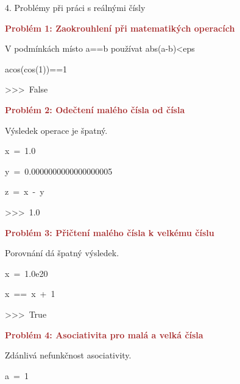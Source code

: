 \documentclass[czech]{beamer}
\newenvironment{lyxcode}
  {\par\begin{list}{}{
    \setlength{\rightmargin}{\leftmargin}
    \setlength{\listparindent}{0pt}%
    \raggedright
    \setlength{\itemsep}{0pt}
    \setlength{\parsep}{0pt}
    \normalfont\ttfamily}%
   \def\{{\char`\{}
   \def\}{\char`\}}
   \def\textasciitilde{\char`\~}
   \item[]}
  {\end{list}}
\begin{document}
\begin{frame}[plain]{4. Problémy při práci s reálnými čísly}

{\tiny\textbf{\textcolor{brown}{Problém 1: Zaokrouhlení při matematikých
operacích}}}{\tiny\par}

{\tiny V podmínkách místo a==b používat abs(a-b)<eps}{\tiny\par}
\begin{lyxcode}
{\tiny acos(cos(1))==1}{\tiny\par}

{\tiny >\textcompwordmark >\textcompwordmark >~False}{\tiny\par}
\end{lyxcode}
{\tiny\textbf{\textcolor{brown}{Problém 2: Odečtení malého čísla od
čísla}}}{\tiny\par}

{\tiny Výsledek operace je špatný.}{\tiny\par}
\begin{lyxcode}
{\tiny x~=~1.0}{\tiny\par}

{\tiny y~=~0.0000000000000000005}{\tiny\par}

{\tiny z~=~x~-~y}{\tiny\par}

{\tiny >\textcompwordmark >\textcompwordmark >~1.0}{\tiny\par}
\end{lyxcode}
{\tiny\textbf{\textcolor{brown}{Problém 3: Přičtení malého čísla k
velkému číslu}}}{\tiny\par}

{\tiny Porovnání dá špatný výsledek.}{\tiny\par}
\begin{lyxcode}
{\tiny x~=~1.0e20}{\tiny\par}

{\tiny x~==~x~+~1}{\tiny\par}

{\tiny >\textcompwordmark >\textcompwordmark >~True}{\tiny\par}
\end{lyxcode}
{\tiny\textbf{\textcolor{brown}{Problém 4: Asociativita pro malá a
velká čísla}}}{\tiny\par}

{\tiny Zdánlivá nefunkčnost asociativity.}{\tiny\par}
\begin{lyxcode}
{\tiny a~=~1}{\tiny\par}


\end{lyxcode}
\end{frame}
\end{document}
